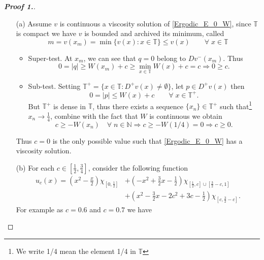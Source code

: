 \documentclass[12pt, oneside]{amsart}  	%
\begin{document}
\begin{proof}[\textbf{Proof 1.}]\quad
\begin{itemize}
\item[(a)] Assume $v$ is continuous a viscosity solution of \eqref{Ergodic_E_0_W}, since $\mathbb{T}$ is compact we have $v$ is bounded and archived its minimum, called
$$m = v(x_m) = \min \{v(x):x\in \mathbb{T}\} \leq v(x) \qquad\forall\;x\in \mathbb{T} $$
\begin{itemize}
\item Super-test. At $x_m$, we can see that $q = 0$ belong to $Dv^-(x_m)$. Thus
\begin{equation*}
0 = |q| \geq W(x_m)+c \geq \min_{x\in \mathbb{T}} W(x) + c = c \Longrightarrow 0\geq c.
\end{equation*}
\item Sub-test. Setting $\mathbb{T}^+ = \{x\in \mathbb{T}: D^+v(x) \neq \emptyset\}$, let $p\in D^+v(x)$ then
\begin{equation*}
0 = |p| \leq W(x)+c \qquad\forall\; x\in \mathbb{T}^+.
\end{equation*}
But $\mathbb{T}^+$ is dense in $\mathbb{T}$, thus there exists a sequence $\{x_n\}\in \mathbb{T}^+$ such that\footnote{We write 1/4 mean the element 1/4 in $\mathbb{T}$} $x_n\longrightarrow \frac{1}{4}$, combine with the fact that $W$ is continuous we obtain
\begin{equation*}
c\geq -W(x_n) \quad\forall\;n\in \mathbb{N} \Longrightarrow c \geq -W\left(1/4\right) = 0 \Longrightarrow c\geq 0.
\end{equation*}

\end{itemize}
Thus $c = 0$ is the only possible value such that \eqref{Ergodic_E_0_W} has a viscosity solution.

\item[(b)] For each $c\in \left[\frac{1}{2},\frac{3}{4}\right]$, consider the following function
\begin{align*}
u_c(x) = \left(x^2-\frac{x}{2}\right)\chi_{\left[0,\frac{1}{2}\right]} &+ \left(-x^2 + \frac{3}{2}x - \frac{1}{2}\right)\chi_{\left[\frac{1}{2},c\right]\cup \left[\frac{3}{2}-c,1\right]}\\
&+ \left(x^2-\frac{3}{2}x -2c^2 + 3c-\frac{1}{2}\right)\chi_{\left[c,\frac{3}{2}-c\right]} .
\end{align*}
For example as $c = 0.6$ and $c= 0.7$ we have


\end{itemize}
\end{proof}
\end{document}
